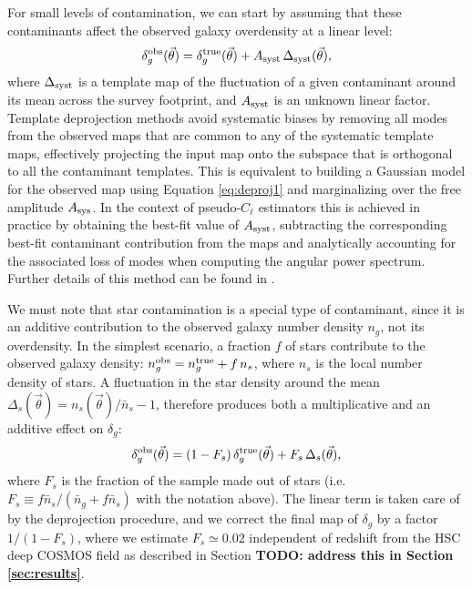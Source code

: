 \documentclass[a4paper,11pt]{article}
\newcommand{\nv}{\vec{\theta}}
\newcommand{\todo}[1]{{\bf TODO: #1}}
\begin{document}
    For small levels of contamination, we can start by assuming that these contaminants affect the observed galaxy overdensity at a linear level:
    \begin{equation}\label{eq:deproj1}
      \delta_g^{\rm obs}(\nv) = \delta_g^{\rm true}(\nv) + A_{\rm syst}\,\Delta_{\rm syst}(\nv),
    \end{equation}
    where $\Delta_{\rm syst}$ is a template map of the fluctuation of a given contaminant around its mean across the survey footprint, and $A_{\rm syst}$ is an unknown linear factor. Template deprojection methods avoid systematic biases by removing all modes from the observed maps that are common to any of the systematic template maps, effectively projecting the input map onto the subspace that is orthogonal to all the contaminant templates. This is equivalent to building a Gaussian model for the observed map using Equation \ref{eq:deproj1} and marginalizing over the free amplitude $A_{\rm sys}$. In the context of pseudo-$C_\ell$ estimators this is achieved in practice by obtaining the best-fit value of $A_{\rm syst}$, subtracting the corresponding best-fit contaminant contribution from the maps and analytically accounting for the associated loss of modes when computing the angular power spectrum. Further details of this method can be found in \cite{2017MNRAS.465.1847E,2019MNRAS.484.4127A}.
    
    We must note that star contamination is a special type of contaminant, since it is an additive contribution to the observed galaxy number density $n_g$, not its overdensity. In the simplest scenario, a fraction $f$ of stars contribute to the observed galaxy density: $n_g^{\rm obs}=n^{\rm true}_g+f\,n_s$, where $n_s$ is the local number density of stars. A fluctuation in the star density around the mean $\Delta_s(\nv)=n_s(\nv)/\bar{n}_s-1$, therefore produces both a multiplicative and an additive effect on $\delta_g$:
    \begin{equation}
      \delta_g^{\rm obs}(\nv) = (1-F_s)\,\delta_g^{\rm true}(\nv)+F_s\,\Delta_s(\nv),
    \end{equation}
    where $F_s$ is the fraction of the sample made out of stars (i.e. $F_s\equiv f\bar{n}_s/(\bar{n}_g+f\bar{n}_s)$ with the notation above). The linear term is taken care of by the deprojection procedure, and we correct the final map of $\delta_g$ by a factor $1/(1-F_s)$, where we estimate $F_s\simeq0.02$ independent of redshift from the HSC deep COSMOS field as described in Section \todo{address this in Section \ref{sec:results}}.
\end{document}
